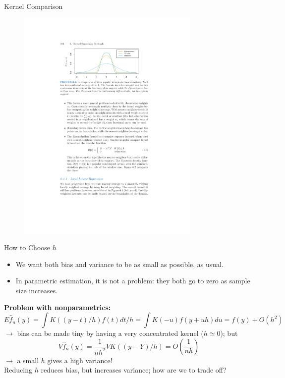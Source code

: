 \documentclass[11pt,handout,xcolor=pdftex,dvipsnames,table,mathserif,aspectratio=169]{beamer}
\begin{document}
\begin{frame}{Kernel Comparison}
\begin{figure}[htbp]
\begin{center}
\includegraphics[width=3.5in]{./resources/kernelfig.pdf}
\label{classOLS}
\end{center}
\end{figure}
\end{frame}


\begin{frame}{How to Choose $h$}
\begin{itemize}
\item We want both bias and variance to be as small as possible, as usual. 
\item In parametric estimation, it is not a problem: they both go to zero as sample size increases.
\end{itemize}
 {\bf Problem with nonparametrics:}
$$E\hat{f}_n(y)=\int K((y-t)/h)f(t)dt/h=\int K(-u)f(y+uh)du=f(y)+O(h^2)$$
$\rightarrow$ bias can be made tiny by having a very concentrated kernel ($h\simeq 0$);
but 
$$V\hat{f}_n(y)=\frac{1}{nh^2}VK((y-Y)/h)=O\left(\frac{1}{nh}\right)$$
$\rightarrow$ a small $h$ gives a high variance! \\
Reducing $h$ reduces bias, but increases variance; how are we to
trade off?
\end{frame}
\end{document}
